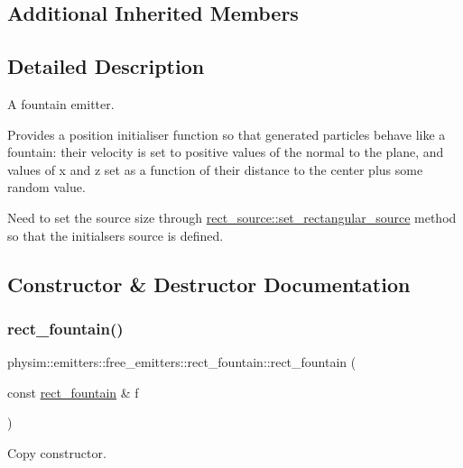 \subsection*{Additional Inherited Members}


\subsection{Detailed Description}
A fountain emitter. 

Provides a position initialiser function so that generated particles behave like a fountain\+: their velocity is set to positive values of the normal to the plane, and values of x and z set as a function of their distance to the center plus some random value.

Need to set the source size through \hyperlink{classphysim_1_1emitters_1_1free__emitters_1_1rect__source_ab85134622163dfc1e3a77730ea94557e}{rect\+\_\+source\+::set\+\_\+rectangular\+\_\+source} method so that the initialser\textquotesingle{}s source is defined. 

\subsection{Constructor \& Destructor Documentation}
\mbox{\label{classphysim_1_1emitters_1_1free__emitters_1_1rect__fountain_a48f4339f6374aa9adbdd1031e1eadb33}} 
\subsubsection{\texorpdfstring{rect\+\_\+fountain()}{rect\_fountain()}}
{\footnotesize\ttfamily physim\+::emitters\+::free\+\_\+emitters\+::rect\+\_\+fountain\+::rect\+\_\+fountain (\begin{DoxyParamCaption}\item[{const \hyperlink{classphysim_1_1emitters_1_1free__emitters_1_1rect__fountain}{rect\+\_\+fountain} \&}]{f }\end{DoxyParamCaption})}



Copy constructor. 

